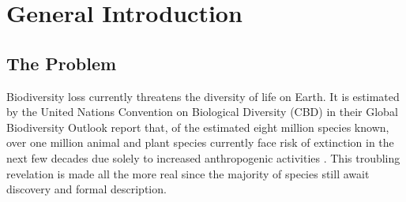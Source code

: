 \linespread{1.0}

\chapter{General Introduction}

\section{The Problem}

Biodiversity loss currently threatens the diversity of life on Earth. It is estimated by the United Nations Convention on Biological Diversity (CBD) in their Global Biodiversity Outlook report that, of the estimated eight million species known, over one million animal and plant species currently face risk of extinction in the next few decades due solely to increased anthropogenic activities \cite{cbd2020global}. This troubling revelation is made all the more real since the majority of species still await discovery and formal description. 



